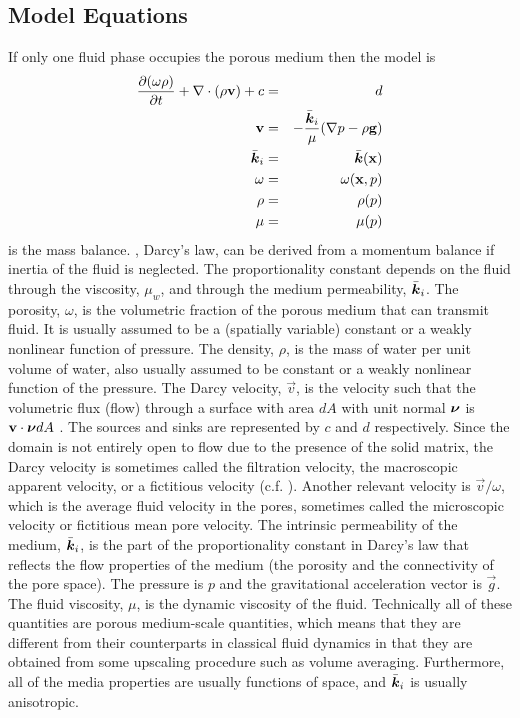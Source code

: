 \documentclass[10pt,dvips,twoside,reqno]{amsart}
\begin{document}
\subsection{Model Equations}
If only one fluid phase occupies the porous medium then the model is
\begin{eqnarray}
\frac{\partial {(\omega \rho)}}{\partial {t}} + \nabla \cdot (\rho {\bf v}) + c&=& d \label{eq:mass_balance} \\
{\bf v} &=& - \frac{\bar{\mbox{{\boldmath ${k}$}}}_i}{\mu}(\nabla p - \rho {\bf g}) \label{eq:volume_flux} \\
\bar{\mbox{{\boldmath ${k}$}}}_i &=&  \bar{\mbox{{\boldmath ${k}$}}}({\bf x}) \\
\omega &=& \omega({\bf x},p) \\
\rho &=& \rho(p) \\
\mu &=& \mu(p) 
\end{eqnarray}
 is the mass balance. , Darcy's
law, can be derived from a momentum balance if inertia of the fluid is
neglected. The proportionality constant depends on the fluid through
the viscosity, $\mu_w$, and through the medium permeability,
$\bar{\mbox{{\boldmath ${k}$}}}_i$.  The porosity, $\omega$, is the volumetric fraction of
the porous medium that can transmit fluid. It is usually assumed to be
a (spatially variable) constant or a weakly nonlinear function of
pressure. The density, $\rho $, is the mass of water per unit volume
of water, also usually assumed to be constant or a weakly nonlinear
function of the pressure. The Darcy velocity, $\vec v $, is the
velocity such that the volumetric flux (flow) through a surface with
area $dA$ with unit normal $\mbox{{\boldmath ${\nu}$}}$ is ${\bf v} \cdot \mbox{{\boldmath ${\nu}$}} dA$
\citep{Chavent_Jaffre_86}. The sources and sinks are represented by
$c$ and $d$ respectively.  Since the domain is not entirely open to
flow due to the presence of the solid matrix, the Darcy velocity is
sometimes called the filtration velocity, the macroscopic apparent
velocity, or a fictitious velocity (c.f.
\citep{DeMarsily_86,Chavent_Jaffre_86}).  Another relevant velocity is
$\vec v / \omega$, which is the average fluid velocity in the pores,
sometimes called the microscopic velocity or fictitious mean pore
velocity. The intrinsic permeability of the medium, $\bar{\mbox{{\boldmath ${k}$}}}_i$, is
the part of the proportionality constant in Darcy's law that reflects
the flow properties of the medium (the porosity and the connectivity
of the pore space).  The pressure is $p$ and the gravitational
acceleration vector is $\vec g$. The fluid viscosity, $\mu$, is the
dynamic viscosity of the fluid. Technically all of these quantities
are porous medium-scale quantities, which means that they are different
from their counterparts in classical fluid dynamics in that they are
obtained from some upscaling procedure such as volume averaging.
Furthermore, all of the media properties are usually functions of
space, and $\bar{\mbox{{\boldmath ${k}$}}}_i$ is usually anisotropic.
\end{document}
